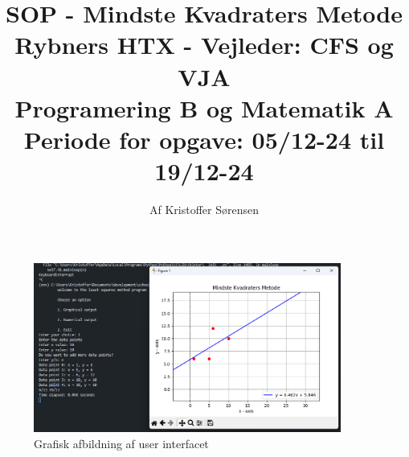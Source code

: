 \title{
    SOP - Mindste Kvadraters Metode \\ 
    \large{Rybners HTX - Vejleder: CFS og VJA} \\
    \small{Programering B og Matematik A}\\
    \small{Periode for opgave: 05/12-24 til 19/12-24}
}
\author{Af Kristoffer Sørensen}
\thispagestyle{empty}
\maketitle
\begin{figure}[h!]
    \centering
    \includegraphics[width=0.9\textwidth]{figures/forsideimg.png}
    \caption{Grafisk afbildning af user interfacet}
    \label{fig:userinterface}
\end{figure}
\newpage